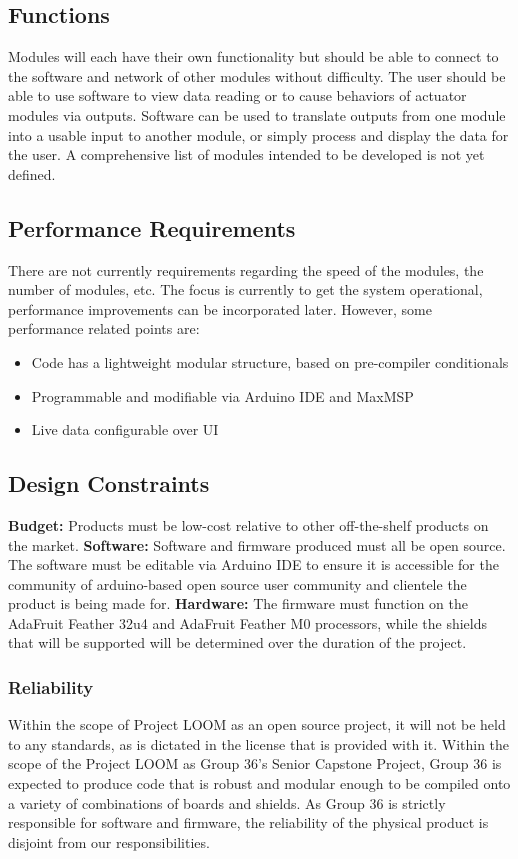 \documentclass[onecolumn, draftclsnofoot,10pt, compsoc]{IEEEtran}
\begin{document}
	\subsection{Functions}
	Modules will each have their own functionality but should be able to connect to the software and network of other modules without difficulty. The user should be able to use software to view data reading or to cause behaviors of actuator modules via outputs. Software can be used to translate outputs from one module into a usable input to another module, or simply process and display the data for the user. A comprehensive list of modules intended to be developed is not yet defined.

	\subsection{Performance Requirements}
	There are not currently requirements regarding the speed of the modules, the number of modules, etc. The focus is currently to get the system operational, performance improvements can be incorporated later. However, some performance related points are:
	\begin{itemize}
		\item Code has a lightweight modular structure, based on pre-compiler conditionals
		\item Programmable and modifiable via Arduino IDE and MaxMSP
		\item Live data configurable over UI 
	\end{itemize}

	\subsection{Design Constraints}
		\textbf{Budget:} Products must be low-cost relative to other off-the-shelf products on the market. \newline
		\textbf{Software:} Software and firmware produced must all be open source. The software must be editable via Arduino IDE to ensure it is accessible for the community of arduino-based open source user community and clientele the product is being made for. \newline
		\textbf{Hardware:} The firmware must function on the AdaFruit Feather 32u4 and AdaFruit Feather M0 processors, while the shields that will be supported will be determined over the duration of the project.

		\subsubsection{Reliability}
		Within the scope of Project LOOM as an open source project, it will not be held to any standards, as is dictated in the license that is provided with it.
		Within the scope of the Project LOOM as Group 36’s Senior Capstone Project, Group 36 is expected to produce code that is robust and modular enough to be compiled onto a variety of combinations of boards and shields. As Group 36 is strictly responsible for software and firmware, the reliability of the physical product is disjoint from our responsibilities.
\end{document}
